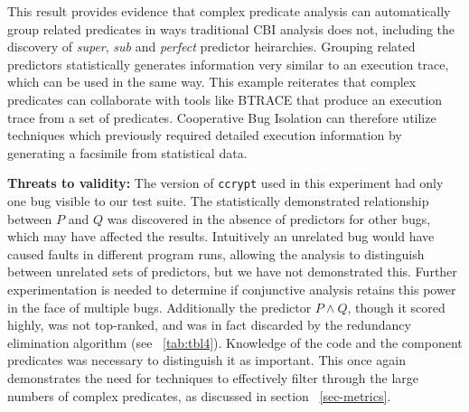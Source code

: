 This result provides evidence that complex predicate analysis can automatically group related predicates in ways traditional CBI analysis does not, including the discovery of \textit{super}, \textit{sub} and \textit{perfect} predictor heirarchies.  Grouping related predictors statistically generates information very similar to an execution trace, which can be used in the same way.  This example reiterates that complex predicates can collaborate with tools like BTRACE that produce an execution trace from a set of predicates.  Cooperative Bug Isolation can therefore utilize techniques which previously required detailed execution information by generating a facsimile from statistical data.

\vspace{4pt} \noindent
{\bf Threats to validity:}
The version of \texttt{ccrypt} used in this experiment had only one bug visible to our test suite.  The statistically demonstrated relationship between $P$ and $Q$ was discovered in the absence of predictors for other bugs, which may have affected the results.  Intuitively an unrelated bug would have caused faults in different program runs, allowing the analysis to distinguish between unrelated sets of predictors, but we have not demonstrated this.  Further experimentation is needed to determine if conjunctive analysis retains this power in the face of multiple bugs.  Additionally the predictor $P \wedge Q$, though it scored highly, was not top-ranked, and was in fact discarded by the redundancy elimination algorithm (see ~\autoref{tab:tbl4}).  Knowledge of the code and the component predicates was necessary to distinguish it as important.  This once again demonstrates the need for techniques to effectively filter through the large numbers of complex predicates, as discussed in section ~\ref{sec-metrics}.
